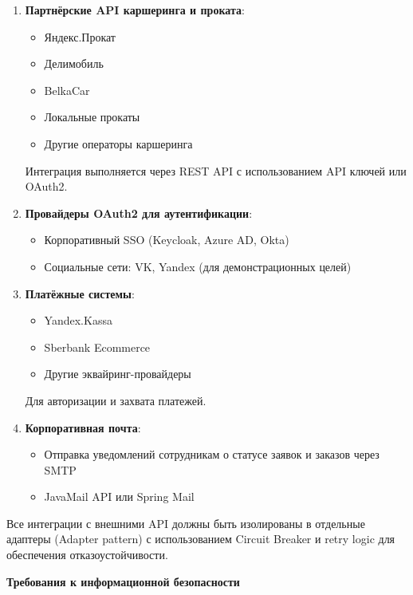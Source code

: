 \documentclass{bmstu}
\begin{document}
\begin{enumerate}
    \item \textbf{Партнёрские API каршеринга и проката}:
    \begin{itemize}
        \item Яндекс.Прокат
        \item Делимобиль
        \item BelkaCar
        \item Локальные прокаты
        \item Другие операторы каршеринга
    \end{itemize}
    Интеграция выполняется через REST API с использованием API ключей или OAuth2.
    
    \item \textbf{Провайдеры OAuth2 для аутентификации}:
    \begin{itemize}
        \item Корпоративный SSO (Keycloak, Azure AD, Okta)
        \item Социальные сети: VK, Yandex (для демонстрационных целей)
    \end{itemize}
    
    \item \textbf{Платёжные системы}:
    \begin{itemize}
        \item Yandex.Kassa
        \item Sberbank Ecommerce
        \item Другие эквайринг-провайдеры
    \end{itemize}
    Для авторизации и захвата платежей.
    
    \item \textbf{Корпоративная почта}:
    \begin{itemize}
        \item Отправка уведомлений сотрудникам о статусе заявок и заказов через SMTP
        \item JavaMail API или Spring Mail
    \end{itemize}
\end{enumerate}

Все интеграции с внешними API должны быть изолированы в отдельные адаптеры (Adapter pattern) с использованием Circuit Breaker и retry logic для обеспечения отказоустойчивости.

\begin{center}
    \textbf{Требования к информационной безопасности}
\end{center}
\end{document}
